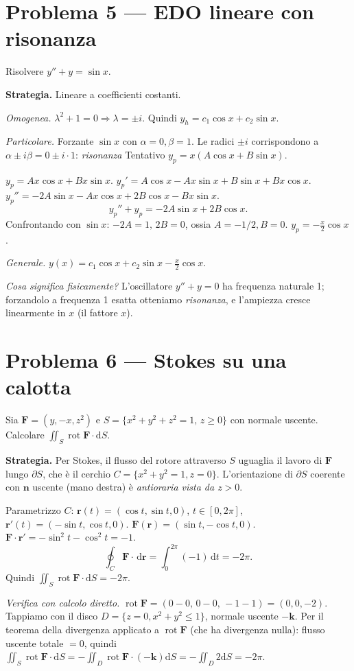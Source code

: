 \documentclass[11pt,a4paper,openany]{book}
\theoremstyle{plain}
\theoremstyle{definition}
\theoremstyle{remark}
\newcommand{\dd}{\,\mathrm{d}}
\newcommand{\Rot}{\operatorname{rot}}
\renewcommand{\vec}[1]{\mathbf{#1}}
\newcommand{\F}{\mathbf{F}}
\newcommand{\rr}{\mathbf{r}}
\newcommand{\nn}{\mathbf{n}}
\newcommand{\dS}{\mathrm{d}S}
\begin{document}
\section*{Problema 5 --- EDO lineare con risonanza}

Risolvere $y''+y=\sin x$.

\begin{esempio}
\textbf{Strategia.} Lineare a coefficienti costanti.

\emph{Omogenea.} $\lambda^2+1=0\Rightarrow\lambda=\pm i$. Quindi
$y_h=c_1\cos x+c_2\sin x$.

\emph{Particolare.} Forzante $\sin x$ con $\alpha=0,\beta=1$. Le radici
$\pm i$ corrispondono a $\alpha\pm i\beta=0\pm i\cdot 1$: \emph{risonanza}\!
Tentativo $y_p=x(A\cos x+B\sin x)$.

$y_p=Ax\cos x+Bx\sin x$.
$y_p'=A\cos x-Ax\sin x+B\sin x+Bx\cos x$.
$y_p''=-2A\sin x-Ax\cos x+2B\cos x-Bx\sin x$.
\[
  y_p''+y_p=-2A\sin x+2B\cos x.
\]
Confrontando con $\sin x$: $-2A=1,\,2B=0$, ossia $A=-1/2,B=0$.
$y_p=-\frac{x}{2}\cos x$.

\emph{Generale.} $y(x)=c_1\cos x+c_2\sin x-\frac{x}{2}\cos x$.

\textsl{Cosa significa fisicamente?} L'oscillatore $y''+y=0$ ha frequenza
naturale 1; forzandolo a frequenza 1 esatta otteniamo \emph{risonanza}, e
l'ampiezza cresce linearmente in $x$ (il fattore $x$).
\end{esempio}

\section*{Problema 6 --- Stokes su una calotta}

Sia $\F=(y,-x,z^2)$ e $S=\{x^2+y^2+z^2=1,\,z\ge 0\}$ con normale uscente.
Calcolare $\iint_S\Rot\F\cdot\dS$.

\begin{esempio}
\textbf{Strategia.} Per Stokes, il flusso del rotore attraverso $S$ uguaglia
il lavoro di $\F$ lungo $\partial S$, che \`e il cerchio $C=\{x^2+y^2=1,z=0\}$.
L'orientazione di $\partial S$ coerente con $\nn$ uscente (mano destra) \`e
\emph{antioraria vista da $z>0$}.

Parametrizzo $C$: $\rr(t)=(\cos t,\sin t,0)$, $t\in[0,2\pi]$,
$\rr'(t)=(-\sin t,\cos t,0)$.
$\F(\rr)=(\sin t,-\cos t,0)$.
$\F\cdot\rr'=-\sin^2 t-\cos^2 t=-1$.
\[
  \oint_C\F\cdot\dd\rr=\int_0^{2\pi}(-1)\dd t=-2\pi.
\]
Quindi $\iint_S\Rot\F\cdot\dS=-2\pi$.

\textsl{Verifica con calcolo diretto.} $\Rot\F=(0-0,\,0-0,\,-1-1)=(0,0,-2)$.
Tappiamo con il disco $D=\{z=0,x^2+y^2\le 1\}$, normale uscente $-\vec{k}$.
Per il teorema della divergenza applicato a $\Rot\F$ (che ha divergenza nulla):
flusso uscente totale $=0$, quindi
$\iint_S\Rot\F\cdot\dS=-\iint_D\Rot\F\cdot(-\vec{k})\dS=-\iint_D 2\dS=-2\pi$. \checkmark
\end{esempio}
\end{document}
